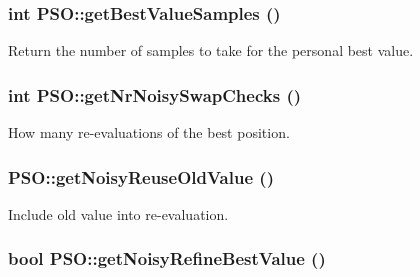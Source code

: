 \hypertarget{classPSO_4f9d31231c71b309637baabc38dafe8e}{
\subsubsection{\setlength{\rightskip}{0pt plus 5cm}int PSO::getBestValueSamples ()}}
\label{classPSO_4f9d31231c71b309637baabc38dafe8e}


Return the number of samples to take for the personal best value. 

\hypertarget{classPSO_d69012e1331e93c50a3c7ec9ebc3d9a1}{
\subsubsection{\setlength{\rightskip}{0pt plus 5cm}int PSO::getNrNoisySwapChecks ()}}
\label{classPSO_d69012e1331e93c50a3c7ec9ebc3d9a1}


How many re-evaluations of the best position. 

\hypertarget{classPSO_b7fa34d665f860e11c91545314a81e39}{
\subsubsection{ PSO::getNoisyReuseOldValue ()}}
\label{classPSO_b7fa34d665f860e11c91545314a81e39}


Include old value into re-evaluation. 

\hypertarget{classPSO_9f0db9ddf94a915706314de77161e556}{
\subsubsection{\setlength{\rightskip}{0pt plus 5cm}bool PSO::getNoisyRefineBestValue ()}}
\label{classPSO_9f0db9ddf94a915706314de77161e556}


